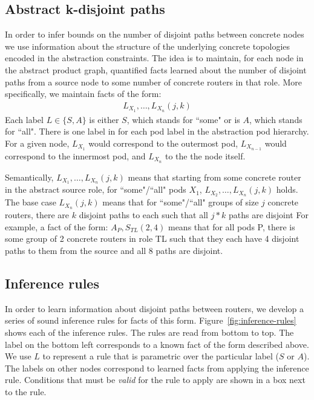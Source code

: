 \documentclass[numbers, 10pt, preprint]{sigplanconf}
\begin{document}
\subsection{Abstract k-disjoint paths}
\label{sec:property-checking}

In order to infer bounds on the number of disjoint paths between concrete nodes we use information about the structure of the underlying concrete topologies encoded in the abstraction constraints.
%
The idea is to maintain, for each node in the abstract product graph, quantified facts learned about the number of disjoint paths from a source node to some number of concrete routers in that role. More specifically, we maintain facts of the form:
%
\[ \begin{array}{c}
  L_{X_1}, \ldots, L_{X_n}(j,k)
\end{array} \]
\noindent
%
Each label $L \in \{S,A\}$ is either $S$, which stands for ``some" or is $A$, which stands for ``all". There is one label in for each pod label in the abstraction pod hierarchy. For a given node, $L_{X_1}$ would correspond to the outermost pod, $L_{X_{n-1}}$ would correspond to the innermost pod, and $L_{X_n}$ to the the node itself.

Semantically, $L_{X_1}, \ldots, L_{X_n}(j,k)$ means that starting from some concrete router in the abstract source role, for ``some"/``all" pods $X_1$, $L_{X_2}, \ldots, L_{X_n}(j,k)$ holds. The base case $L_{X_n}(j,k)$ means that for ``some"/``all" groups of size $j$ concrete routers, there are $k$ disjoint paths to each such that all $j*k$ paths are disjoint
%
For example, a fact of the form: $A_P, S_{TL}(2,4)$ means that for all pods P, there is some group of 2 concrete routers in role TL such that they each have 4 disjoint paths to them from the source and all 8 paths are disjoint.

\subsection{Inference rules}

\newcommand{\infrule}[1]{{\small \sf #1}\xspace}

In order to learn information about disjoint paths between routers, we develop a series of sound inference rules for facts of this form. Figure~\ref{fig:inference-rules} shows each of the inference rules. The rules are read from bottom to top. The label on the bottom left corresponds to a known fact of the form described above. We use $L$ to represent a rule that is parametric over the particular label ($S$ or $A$). The labels on other nodes correspond to learned facts from applying the inference rule. Conditions that must be \emph{valid} for the rule to apply are shown in a box next to the rule.
\end{document}
